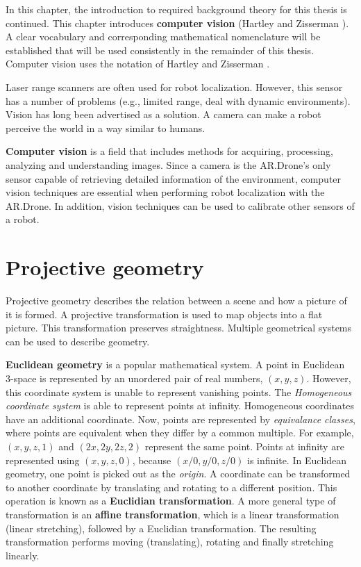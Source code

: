 In this chapter, the introduction to required background theory for this thesis is continued.
This chapter introduces \textbf{computer vision} (Hartley and Zisserman \cite{Hartley2004}).
A clear vocabulary and corresponding mathematical nomenclature will be established that will be used consistently in the remainder of this thesis.
Computer vision uses the notation of Hartley and Zisserman \cite{Hartley2004}.

Laser range scanners are often used for robot localization.
However, this sensor has a number of problems (e.g., limited range, deal with dynamic environments).
Vision has long been advertised as a solution.
A camera can make a robot perceive the world in a way similar to humans.

\textbf{Computer vision} is a field that includes methods for acquiring, processing, analyzing and understanding images.
Since a camera is the AR.Drone's only sensor capable of retrieving detailed information of the environment, computer vision techniques are essential when performing robot localization with the AR.Drone.
In addition, vision techniques can be used to calibrate other sensors of a robot.

\section{Projective geometry}
\label{sec:background-projective-geometry}
Projective geometry describes the relation between a scene and how a picture of it is formed.
A projective transformation is used to map objects into a flat picture.
This transformation preserves straightness.
Multiple geometrical systems can be used to describe geometry.

\textbf{Euclidean geometry} is a popular mathematical system.
A point in Euclidean 3-space is represented by an unordered pair of real numbers, $(x, y, z)$.
However, this coordinate system is unable to represent vanishing points.
The \textit{Homogeneous coordinate system} is able to represent points at infinity.
Homogeneous coordinates have an additional coordinate.
Now, points are represented by \textit{equivalance classes}, where points are equivalent when they differ by a common multiple.
For example, $(x, y, z, 1)$ and $(2x, 2y, 2z, 2)$ represent the same point.
Points at infinity are represented using $(x, y, z, 0)$, because $(x/0, y/0, z/0)$ is infinite.
In Euclidean geometry, one point is picked out as the \textit{origin}.
A coordinate can be transformed to another coordinate by translating and rotating to a different position.
This operation is known as a \textbf{Euclidian transformation}.
A more general type of transformation is an \textbf{affine transformation}, which is a linear transformation (linear stretching), followed by a Euclidian transformation.
The resulting transformation performs moving (translating), rotating and finally stretching linearly.

